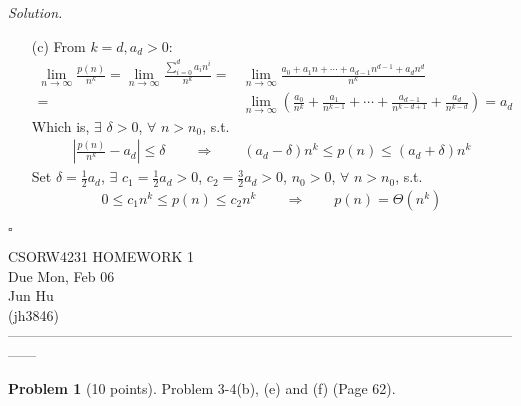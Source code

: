 \documentclass[11pt]{article}
\theoremstyle{definition}
\newtheorem{problem}{Problem}
\newenvironment{solution}{\noindent\emph{Solution.}}{\hfill$\square$}
\begin{document}
\begin{solution}
\begin{enumerate}
    \item[(c)]
    From $k=d, a_d > 0$:
     \begin{align*}
    \lim_{n \to \infty} \frac{p(n)}{n^k} 
    =\lim_{n \to \infty} \frac{\sum_{i=0}^d a_i n^i}{n^k} 
    =&\lim_{n \to \infty} \frac{a_0 + a_1 n + \cdots + a_{d-1} n^{d-1} + a_d n^d}{n^k} \\
    =&\lim_{n \to \infty} \left( \frac{a_0}{n^k} + \frac{a_1}{n^{k-1}} + \cdots + \frac{a_{d-1}}{n^{k-d+1}} + \frac{a_d}{n^{k-d}} \right) 
    = a_d
    \end{align*}
    Which is, $\exists$ $\delta > 0$, $\forall$ $n > n_0$, s.t.
    \begin{align*}
    \left| \frac{p(n)}{n^k} - a_d \right| \leq \delta \qquad \Rightarrow \qquad
    (a_d - \delta)n^k \leq p(n) \leq (a_d + \delta) n^k
     \end{align*}
     Set $\delta = \frac{1}{2}a_d$, $\exists$ $c_1 = \frac{1}{2}a_d > 0$, $c_2 = \frac{3}{2}a_d > 0$, $n_0 > 0$, $\forall$ $n > n_0$, s.t.
     \begin{align*}
    0 \leq c_1 n^k \leq p(n) \leq c_2 n^k \qquad \Rightarrow \qquad
    p(n) = \Theta(n^k)
     \end{align*}
      
  \end{enumerate}
\end{solution}

\newpage
\begin{center}
\Large{} 
CSORW4231 HOMEWORK 1 \\
\normalsize{}
Due Mon, Feb 06 \\
\large{Jun Hu \\
(jh3846)} \\ 
------------------------------------------------------------------------------------------------------------------
\end{center}


\begin{problem}[10 points]
  Problem 3-4(b), (e) and (f) (Page 62).
\end{problem}
\end{document}
